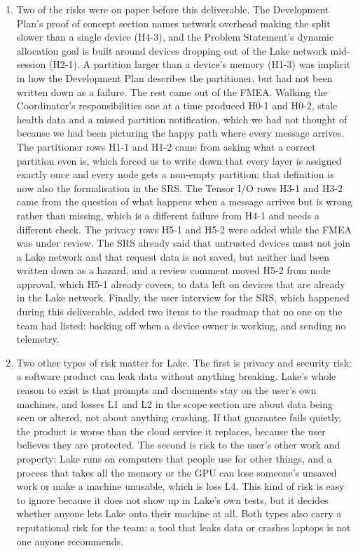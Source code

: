 \documentclass{article}
\begin{document}
\begin{enumerate}
    \item Two of the risks were on paper before this deliverable. The
    Development Plan's proof of concept section names network overhead
    making the split slower than a single device (H4-3), and the Problem
    Statement's dynamic allocation goal is built around devices dropping
    out of the Lake network mid-session (H2-1). A partition larger than a device's
    memory (H1-3) was implicit in how the Development Plan describes the
    partitioner, but had not been written down as a failure. The rest came
    out of the FMEA. Walking the
    Coordinator's responsibilities one at a time produced H0-1 and H0-2,
    stale health data and a missed partition notification, which we had
    not thought of because we had been picturing the happy path where every
    message arrives. The partitioner rows H1-1 and H1-2 came from asking
    what a correct partition even is, which forced us to write down that
    every layer is assigned exactly once and every node gets a non-empty
    partition; that definition is now also the formalisation in the SRS. The
    Tensor I/O rows H3-1 and H3-2 came from the question of what happens
    when a message arrives but is wrong rather than missing, which is a
    different failure from H4-1 and needs a different check. The privacy
    rows H5-1 and H5-2 were added while the FMEA was under review. The SRS
    already said that untrusted devices must not join a Lake network and that
    request data is not saved, but neither had been written down as a
    hazard, and a review comment moved H5-2 from node approval, which H5-1
    already covers, to data left on devices that are already in the Lake network.
    Finally, the
    user interview for the SRS, which happened during this deliverable,
    added two items to the roadmap that no one on the team had listed:
    backing off when a device owner is working, and sending no telemetry.

    \item Two other types of risk matter for Lake. The first is privacy and
    security risk: a software product can leak data without anything
    breaking. Lake's whole reason to exist is that prompts and documents
    stay on the user's own machines, and losses L1 and L2 in the scope
    section are about data being seen or altered, not about anything
    crashing. If that guarantee fails quietly, the product is worse than
    the cloud service it replaces, because the user believes they are
    protected. The second is risk to the user's other work and property:
    Lake runs on computers that people use for other things, and a process
    that takes all the memory or the GPU can lose someone's unsaved work or
    make a machine unusable, which is loss L4. This kind of risk is easy to
    ignore because it does not show up in Lake's own tests, but it decides
    whether anyone lets Lake onto their machine at all. Both types also
    carry a reputational risk for the team: a tool that leaks data or
    crashes laptops is not one anyone recommends.
\end{enumerate}
\end{document}
